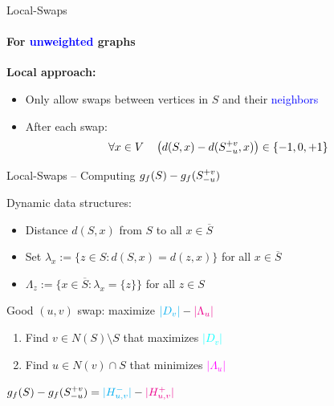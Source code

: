 \documentclass[10pt,titlepage,english,presentation]{beamer}
\newcommand{\emphcolor}{blue}
\renewcommand{\emph}[1]{\textcolor{\emphcolor}{#1}}
\begin{document}
\begin{frame}{Local-Swaps}
\framesubtitle{For \emph{unweighted} graphs}
%
\vspace{3mm}
\textbf{Local approach:}
\begin{itemize}
    \item Only allow swaps between vertices in $S$ and their \emph{neighbors}
    \item After each swap: \[\forall x\in V\quad\left(d(S, x) - d(S_{-u}^{+v}, x) \right)\in \{-1, 0, +1\}\]
\end{itemize}

\vspace{-4mm}

\end{frame}


\begin{frame}{Local-Swaps -- {\LARGE Computing $g_f(S) - g_f(S_{-u}^{+v})$}}
\medskip\footnotesize

Dynamic data structures:\medskip

\begin{itemize}
    \footnotesize
    \newcommand{\lambdaw}{$\Lambda_z := \{x \in \overline{S} : \lambda_x = \{z\}\}$ for all $z\in S$}
    \item Distance $d(S, x)$ from $S$ to all $x \in \overline{S}$\smallskip
    \item Set $\lambda_x := \{z \in S : d(S, x) = d(z, x)\}$ for all $x\in \overline{S}$\smallskip
    \item\textcolor{HUBmagenta}{\lambdaw}
\end{itemize}\bigskip

\begin{minipage}[t]{.5\textwidth}
Good $(u,v)$ swap: maximize
$\textcolor{cyan}{|D_v|} - \textcolor{magenta}{|\Lambda_u|}$
\begin{enumerate}
    \footnotesize
    \item Find $v\in N(S)\setminus S$ that maximizes \textcolor{cyan}{$|D_v|$}
    \item Find $u \in N(v)\cap S$ that minimizes \textcolor{magenta}{$|\Lambda_u|$}
\end{enumerate}
\end{minipage}\hfill
\begin{minipage}[t]{.4\textwidth}
\begin{figure}
\centering
\hspace{-1cm}
\end{figure}
\end{minipage}\medskip

\begin{block}{\centering\textcolor{black}{$g_f(S) - g_f(S_{-u}^{+v}) =
\textcolor{cyan}{|H^-_{u, v}|} - \textcolor{magenta}{|H^+_{u, v}|}$}}
\vspace{-3ex}
\end{block}
\end{frame}
\end{document}
